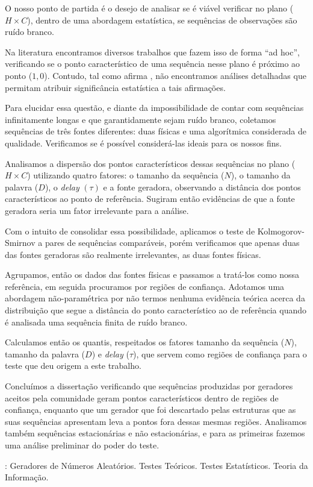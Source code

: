 \documentclass[tcc]{ic}
\begin{document}
\begin{resumo}
\noindent 
O nosso ponto de partida é o desejo de analisar
se é viável verificar no plano ($H\times C$), dentro de uma abordagem estatística, se sequências de observações são ruído branco.

Na literatura encontramos diversos trabalhos que fazem isso de forma ``ad hoc'', verificando se o ponto característico de uma sequência nesse plano é próximo ao ponto ($1,0$). 
Contudo, tal como afirma \citet{NewPermutationEntropy}, não encontramos análises detalhadas que permitam atribuir significância estatística a tais afirmações.

Para elucidar essa questão, e diante da impossibilidade de contar com sequências infinitamente longas e que garantidamente sejam ruído branco, coletamos sequências de três fontes diferentes: duas físicas e uma algorítmica considerada de qualidade.
Verificamos se é possível considerá-las ideais para os nossos fins.

Analisamos a dispersão dos pontos característicos dessas sequências no plano ($H\times C$) utilizando quatro fatores: o tamanho da sequência ($N$), o tamanho da palavra ($D$), o \textit{delay} $(\tau)$ e a fonte geradora, observando a distância dos pontos característicos ao ponto de referência. Sugiram então evidências de que a fonte geradora seria um fator irrelevante para a análise.

Com o intuito de consolidar essa possibilidade, aplicamos o teste de Kolmogorov-Smirnov a pares de sequências comparáveis, porém verificamos que apenas duas das fontes geradoras são realmente irrelevantes, as duas fontes físicas.

Agrupamos, então os dados das fontes físicas e passamos a tratá-los como nossa referência, em seguida procuramos por regiões de confiança. 
Adotamos uma abordagem não-paramétrica por não termos nenhuma evidência teórica acerca da distribuição que segue a distância do ponto característico ao de referência quando é analisada uma sequência finita de ruído branco.

Calculamos então os quantis, respeitados os fatores tamanho da sequência ($N$), tamanho da palavra ($D$) e \textit{delay} ($\tau$), que servem como regiões de confiança para o teste que deu origem a este trabalho.

Concluímos a dissertação verificando que sequências produzidas por geradores aceitos pela comunidade geram pontos característicos dentro de regiões de confiança, enquanto que um gerador que foi descartado pelas estruturas que as suas sequências apresentam leva a pontos fora dessas mesmas regiões.
Analisamos também sequências estacionárias e não estacionárias, e para as primeiras fazemos uma análise preliminar do poder do teste.

\vspace{1em}
: Geradores de Números Aleatórios. Testes Teóricos. Testes Estatísticos. Teoria da Informação.
\end{resumo}
\end{document}
